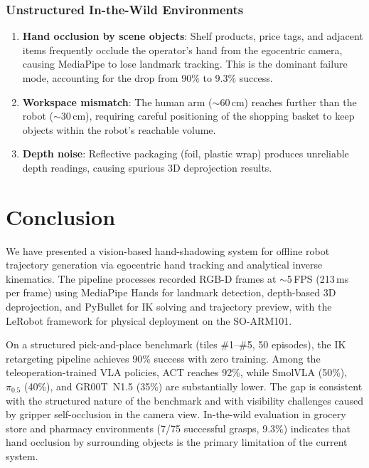 \documentclass[10pt,journal]{IEEEtran}
\begin{document}
\subsubsection{Unstructured In-the-Wild Environments}
\begin{enumerate}
  \item \textbf{Hand occlusion by scene objects}: Shelf products,
        price tags, and adjacent items frequently occlude the
        operator's hand from the egocentric camera, causing MediaPipe
        to lose landmark tracking. This is the dominant failure mode,
        accounting for the drop from 90\% to 9.3\% success.
  \item \textbf{Workspace mismatch}: The human arm (${\sim}$60\,cm)
        reaches further than the robot (${\sim}$30\,cm), requiring
        careful positioning of the shopping basket to keep objects
        within the robot's reachable volume.
  \item \textbf{Depth noise}: Reflective packaging (foil, plastic
        wrap) produces unreliable depth readings, causing spurious
        3D deprojection results.
\end{enumerate}

\section{Conclusion}

We have presented a vision-based hand-shadowing system for
offline robot trajectory generation via egocentric hand tracking and
analytical inverse kinematics. The pipeline processes recorded RGB-D frames at
${\sim}$5\,FPS (213\,ms per frame) using MediaPipe Hands for landmark
detection, depth-based 3D deprojection, and PyBullet for IK solving
and trajectory preview, with the LeRobot framework for physical
deployment on the SO-ARM101.

On a structured pick-and-place benchmark (tiles \#1--\#5, 50 episodes),
the IK retargeting pipeline achieves 90\% success with zero training.
Among the teleoperation-trained VLA policies, ACT reaches 92\%, while
SmolVLA (50\%), $\pi_{0.5}$ (40\%), and GR00T~N1.5 (35\%) are
substantially lower. The gap is consistent with the structured nature
of the benchmark and with visibility challenges caused by gripper
self-occlusion in the camera view.
In-the-wild evaluation in grocery store and pharmacy environments
(7/75 successful grasps, 9.3\%) indicates that hand occlusion by
surrounding objects is the primary limitation of the current system.
\end{document}
